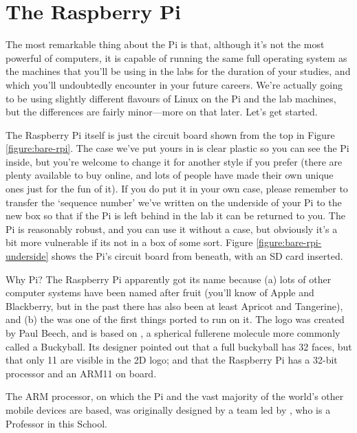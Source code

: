 \FloatBarrier 
\section{The Raspberry Pi}

The most remarkable thing about the Pi is that, although it's not the most powerful of computers, it is capable of running the same full  operating system as the machines that you'll be using in the labs for the duration of your studies, and which you'll undoubtedly encounter in your future careers. We're actually going to be using slightly different flavours of Linux on the Pi and the lab machines, but the differences are fairly minor---more on that later. Let's get started. 

The Raspberry Pi itself is just the circuit board shown from the top in Figure \ref{figure:bare-rpi}. The case we've put yours in is clear plastic so you can see the Pi inside, but you're welcome to change it for another style if you prefer (there are plenty available to buy online, and lots of people have made their own unique ones just for the fun of it). If you do put it in your own case, please remember to transfer the `sequence number' we've written on the underside of your Pi to the new box so that if the Pi is left behind in the lab it can be returned to you. The Pi is reasonably robust, and you can use it without a case, but obviously it's a bit more vulnerable if its not in a box of some sort. Figure \ref{figure:bare-rpi-underside} shows the Pi's circuit board from beneath, with an SD card inserted.

\begin{rpi}{Why Pi?}
  The Raspberry Pi apparently got its name because (a) lots of other computer systems have been named after fruit (you'll know of Apple and Blackberry, but in the past there has also been at least Apricot and Tangerine), and (b) the  was one of the first things ported to run on it. The logo was created by Paul Beech, and is based on , a spherical fullerene molecule more commonly called a Buckyball. Its designer pointed out that a full buckyball has 32 faces, but that only 11 are visible in the 2D logo; and that the Raspberry Pi has a 32-bit processor and an ARM11 on board.

The ARM processor, on which the Pi and the vast majority of the world's other mobile devices are based, was originally designed by a team led by , who is a Professor in this School.  
\end{rpi}

